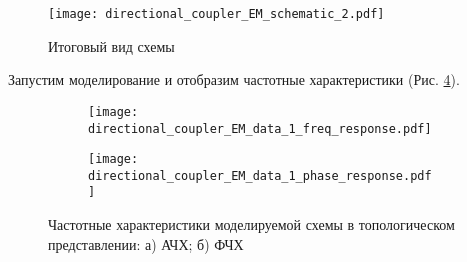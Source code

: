 \begin{figure}[p]
    \centering
    \texttt{[image: directional\_coupler\_EM\_schematic\_2.pdf]}
    \caption{Итоговый вид схемы}
    \label{fig:directional_coupler_EM_schematic_2}
\end{figure}

Запустим моделирование и отобразим частотные характеристики (Рис. \ref{fig:directional_coupler_EM_data_1}).

\begin{figure}[!ht]
    \centering
    \begin{subfigure}[b]{0.45\textwidth}
        \centering
        \texttt{[image: directional\_coupler\_EM\_data\_1\_freq\_response.pdf]}
        \caption{}
        \label{fig:directional_coupler_EM_data_1_freq_response}
    \end{subfigure}
    \hfill
    \begin{subfigure}[b]{0.45\textwidth}
        \centering
        \texttt{[image: directional\_coupler\_EM\_data\_1\_phase\_response.pdf]}
        \caption{}
        \label{fig:directional_coupler_EM_data_1_phase_response}
    \end{subfigure}
    \caption{
        Частотные характеристики моделируемой схемы в топологическом представлении:
        а) АЧХ;
        б) ФЧХ
    }
    \label{fig:directional_coupler_EM_data_1}
\end{figure}

